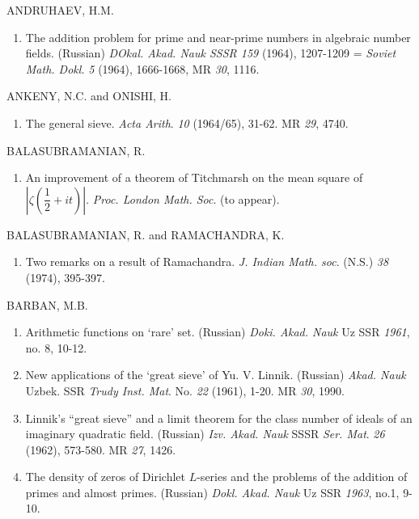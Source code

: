 \begin{thebibliography}{99}\pageoriginale  
{}  ANDRUHAEV, H.M. 
\begin{enumerate}
\item The addition problem for prime and
  near-prime numbers in algebraic number fields. (Russian) \textit{
    DOkal. Akad. Nauk SSSR 159} (1964), 1207-1209 = {\em Soviet
    Math. Dokl.} {\em 5} (1964), 1666-1668, MR {\em 30}, 1116.  
\end{enumerate}

 ANKENY, N.C. and ONISHI, H. 
\begin{enumerate}
\item The general
  sieve. \textit{Acta Arith}. {\em 10} (1964/65), 31-62. MR {\em 29}, 4740.
\end{enumerate}

 BALASUBRAMANIAN, R. 
\begin{enumerate}
\item
An improvement of a theorem
  of Titchmarsh on the mean square of $|\zeta (\dfrac{1}{2} +
  it)|$. \textit{Proc. London Math. Soc}. (to appear).  
\end{enumerate}

BALASUBRAMANIAN, R. and RAMACHANDRA, K.
\begin{enumerate}
\item Two remarks on a result of Ramachandra.  \textit{J. Indian
  Math. soc}. (N.S.) {\em 38} (1974), 395-397.
\end{enumerate}

 BARBAN, M.B.
\begin{enumerate}
\item Arithmetic functions on `rare' set. (Russian) \textit{Doki. Akad.
  Nauk} Uz SSR {\em 1961}, no. 8, 10-12. 

\item New applications of the `great sieve' of
  Yu. V. Linnik. (Russian) \textit{Akad. Nauk} Uzbek. SSR
  \textit{Trudy Inst. Mat}. No. {\em 22} (1961), 1-20. MR {\em 30},
  1990.  

\item Linnik's ``great sieve'' and a limit theorem for the class
  number of ideals of an imaginary quadratic field. (Russian)
  \textit{Izv. Akad. Nauk} SSSR \textit{Ser. Mat}. {\em 26} (1962),
  573-580. MR {\em 27}, 1426. 

\item The density of zeros of Dirichlet $L$-series and the problems
  of the addition of primes and almost primes. (Russian)
  \textit{Dokl. Akad. Nauk} Uz SSR {\em 1963}, no.1, 9-10.  


\end{enumerate}
\end{thebibliography}
